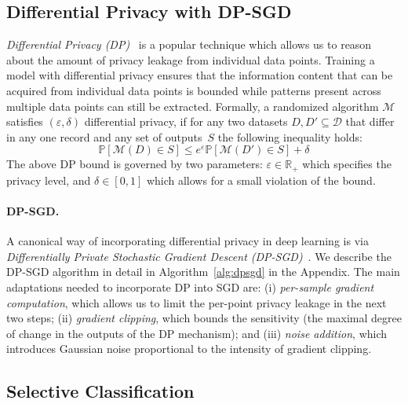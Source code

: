 \subsection{Differential Privacy with DP-SGD}
\label{sec:def_dp}

\emph{Differential Privacy (DP)}~\citep{dwork2014algorithmic} is a popular technique which allows us to reason about the amount of privacy leakage from individual data points. %
Training a model with differential privacy ensures that the information content that can be acquired from individual data points is bounded while patterns present across multiple data points can still be extracted. Formally, a randomized algorithm $\mathcal{M}$ satisfies $(\varepsilon, \delta)$ differential privacy, if for any two datasets $D, D'\subseteq \mathcal{D}$ that differ in any one record and any set of outputs~$S$ the following inequality holds:
\begin{equation}
\label{eq:dp}
    \mathbb{P}\left[\mathcal{M}(D) \in S\right] \leq e^\varepsilon  \mathbb{P}\left[\mathcal{M}(D') \in S\right] + \delta
\end{equation}
The above DP bound is governed by two parameters: $\varepsilon \in \mathbb{R}_+$ which specifies the privacy level, and $\delta \in [0, 1]$ which allows for a small violation of the bound. %

\paragraph{DP-SGD.} A canonical way of incorporating differential privacy in deep learning is via \emph{Differentially Private Stochastic Gradient Descent (DP-SGD)}~\citep{bassily2014private,abadi2016deep}. We describe the DP-SGD algorithm in detail in Algorithm~\ref{alg:dpsgd} in the Appendix. The main adaptations needed to incorporate DP into SGD are: (i) \emph{per-sample gradient computation}, which allows us to limit the per-point privacy leakage in the next two steps; (ii) \emph{gradient clipping}, which bounds the sensitivity (\ie the maximal degree of change in the outputs of the DP mechanism); and (iii) \emph{noise addition}, which introduces Gaussian noise proportional to the intensity of gradient clipping.

\subsection{Selective Classification}


